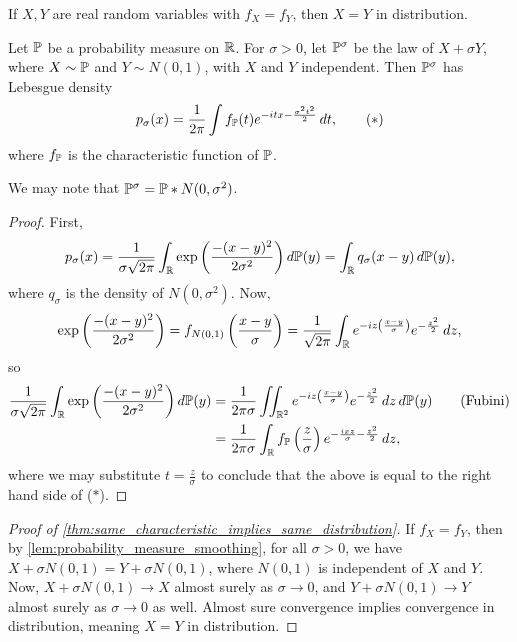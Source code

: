 \newpage
\begin{theorem}[Panchenko \S3.4] \label{thm:same_characteristic_implies_same_distribution}
    If $X, Y$ are real random variables with $f_X = f_Y$, then $X = Y$ in distribution.
\end{theorem}

\begin{lemma}[Panchenko \S3.6] \label{lem:probability_measure_smoothing}
    Let $\mathbb P$ be a probability measure on $\mathbb R$. For $\sigma > 0$, let $\mathbb P^\sigma$ be the law of $X + \sigma Y$, where $X \sim \mathbb P$ and $Y \sim N(0, 1)$, with $X$ and $Y$ independent. Then $\mathbb P^\sigma$ has Lebesgue density
    \[ p_\sigma(x) = \frac{1}{2\pi} \int f_\mathbb P(t) e^{-itx - \frac{\sigma^2 t^2}{2}} \, dt, \tag{$\ast$} \]
    where $f_\mathbb P$ is the characteristic function of $\mathbb P$.
\end{lemma}
We may note that $\mathbb P^\sigma = \mathbb P \ast N(0, \sigma^2)$.
\begin{proof}
    First,
    \[ p_\sigma(x) = \frac{1}{\sigma \sqrt{2\pi}} \int_\mathbb R \exp\left(\frac{-(x - y)^2}{2\sigma^2}\right) d\mathbb P(y) = \int_\mathbb R q_\sigma(x - y) \, d\mathbb P(y), \]
    where $q_\sigma$ is the density of $N(0, \sigma^2)$. Now,
    \[ \exp\left(\frac{-(x - y)^2}{2\sigma^2}\right) = f_{N(0, 1)} \left(\frac{x - y}{\sigma}\right) = \frac{1}{\sqrt{2\pi}} \int_\mathbb R e^{-iz \left(\frac{x - y}{\sigma}\right)} e^{- \frac{z^2}{2}} \, dz, \]
    so
    \begin{align*}
        \frac{1}{\sigma \sqrt{2\pi}} \int_\mathbb R \exp\left(\frac{-(x - y)^2}{2\sigma^2}\right) d\mathbb P(y) &= \frac{1}{2\pi \sigma} \iint_{\mathbb R^2} e^{-iz \left(\frac{x - y}{\sigma}\right)} e^{-\frac{z^2}{2}} \, dz \, d\mathbb P(y) \tag{Fubini} \\
        &= \frac{1}{2\pi \sigma} \int_\mathbb R f_\mathbb P\left(\frac{z}{\sigma}\right) e^{-\frac{ixz}{\sigma} - \frac{z^2}{2}} \, dz,
    \end{align*}
    where we may substitute $t = \frac{z}{\sigma}$ to conclude that the above is equal to the right hand side of ($\ast$).
\end{proof}

\begin{proof}[Proof of \ref{thm:same_characteristic_implies_same_distribution}]
    If $f_X = f_Y$, then by \ref{lem:probability_measure_smoothing}, for all $\sigma > 0$, we have $X + \sigma N(0, 1) = Y + \sigma N(0, 1)$, where $N(0, 1)$ is independent of $X$ and $Y$. Now, $X + \sigma N(0, 1) \to X$ almost surely as $\sigma \to 0$, and $Y + \sigma N(0, 1) \to Y$ almost surely as $\sigma \to 0$ as well. Almost sure convergence implies convergence in distribution, meaning $X = Y$ in distribution.
\end{proof}

